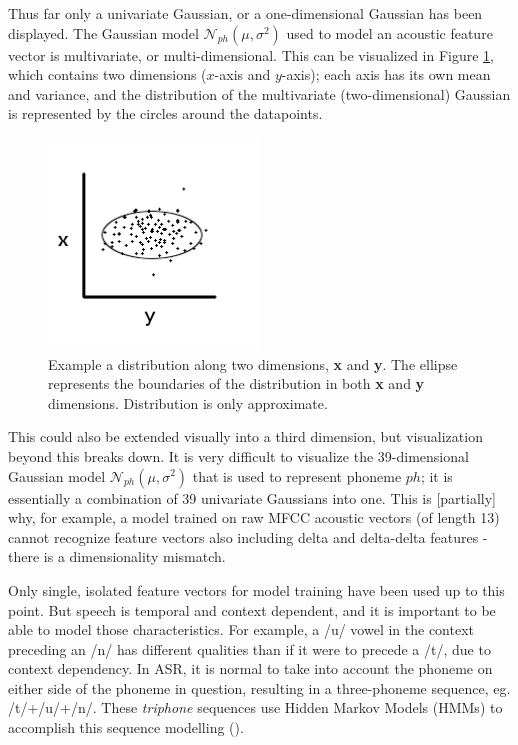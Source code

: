 Thus far only a univariate Gaussian, or a one-dimensional Gaussian has been displayed.  The Gaussian model $\mathcal{N}_{ph}(\mu,\sigma^2)$ used to model an acoustic feature vector is multivariate, or multi-dimensional.  This can be visualized in Figure \ref{fig:two-dim-gauss}, which contains two dimensions ($x$-axis and $y$-axis); each axis has its own mean and variance, and the distribution of the multivariate (two-dimensional) Gaussian is represented by the circles around the datapoints.  
\begin{figure}
\includegraphics[width=0.5\textwidth]{figure/two-dim-gauss.png}
\caption{Example a distribution along two dimensions, \textbf{x} and \textbf{y}.  The ellipse represents the boundaries of the distribution in both \textbf{x} and \textbf{y} dimensions. Distribution is only approximate.}\label{fig:two-dim-gauss}
\end{figure}
This could also be extended visually into a third dimension, but visualization beyond this breaks down.  It is very difficult to visualize the 39-dimensional Gaussian model $\mathcal{N}_{ph}(\mu,\sigma^2)$ that is used to represent phoneme $ph$; it is essentially a combination of 39 univariate Gaussians into one.
This is [partially] why, for example, a model trained on raw MFCC acoustic vectors (of length 13) cannot recognize feature vectors also including delta and delta-delta features - there is a dimensionality mismatch.


Only single, isolated feature vectors for model training have been used up to this point.  But speech is temporal and context dependent, and it is important to be able to model those characteristics.  For example, a /u/ vowel in the context preceding an /n/ has different qualities than if it were to precede a /t/, due to context dependency.  In ASR, it is normal to take into account the phoneme on either side of the phoneme in question, resulting in a three-phoneme sequence, eg. /t/+/u/+/n/.  These \textit{triphone} sequences use Hidden Markov Models (HMMs) to accomplish this sequence modelling (\cite{jurafsky:09}).

